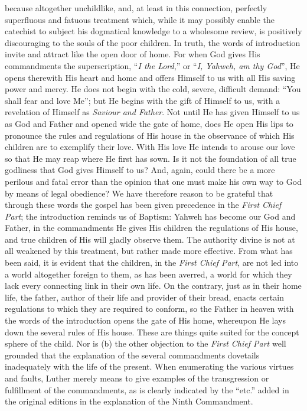 because altogether unchildlike, and, at least in this connection, perfectly superfluous and fatuous treatment which, while it may possibly enable the catechist to subject his dogmatical knowledge to a wholesome review, is positively discouraging to the souls of the poor children. In truth, the words of introduction invite and attract like the open door of home. For when God gives His commandments the superscription, “\emph{I the Lord},” or “\emph{I, Yahweh, am thy God}”, He opens therewith His heart and home and offers Himself to us with all His saving power and mercy. He does not begin with the cold, severe, difficult demand: “You shall fear and love Me”; but He begins with the gift of Himself to us, with a revelation of Himself as \emph{Saviour and Father}. Not until He has given Himself to us as God and Father and opened wide the gate of home, does He open His lips to pronounce the rules and regulations of His house in the observance of which His children are to exemplify their love. With His love He intends to arouse our love so that He may reap where He first has sown. Is it not the foundation of all true godliness that God gives Himself to us? And, again, could there be a more perilous and fatal error than the opinion that one must make his own way to God by means of legal obedience? We have therefore reason to be grateful that through these words the gospel has been given precedence in the \emph{First Chief Part}; the introduction reminds us of Baptism: Yahweh has become our God and Father, in the commandments He gives His children the regulations of His house, and true children of His will gladly observe them. The authority divine is not at all weakened by this treatment, but rather made more effective. From what has been said, it is evident that the children, in the \emph{First Chief Part}, are not led into a world altogether foreign to them, as has been averred, a world for which they lack every connecting link in their own life. On the contrary, just as in their home life, the father, author of their life and provider of their bread, enacts certain regulations to which they are required to conform, so the Father in heaven with the words of the introduction opens the gate of His home, whereupon He lays down the several rules of His house. These are things quite suited for the concept sphere of the child. Nor is (b) the other objection to the \emph{First Chief Part} well grounded that the explanation of the several commandments dovetails inadequately with the life of the present. When enumerating the various virtues and faults, Luther merely means to give examples of the transgression or fulfillment of the commandments, as is clearly indicated by the “etc.” added in the original editions in the explanation of the Ninth Commandment.
